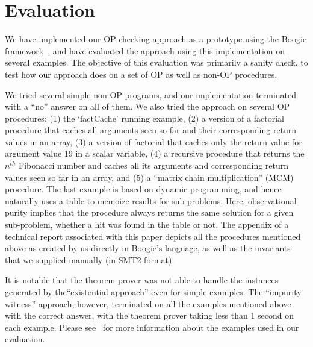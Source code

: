 \section{Evaluation}\label{sec:experiments}

We have implemented our OP checking approach as a prototype using the Boogie
framework~\cite{leino2008boogie}, and have evaluated the approach using
this implementation on several examples. The objective of this evaluation
was primarily a sanity check, to test how our approach does on a set of
OP as well as non-OP procedures.

We tried several simple non-OP programs, and our implementation terminated
with a ``no'' answer on all of them.  We also tried the approach on several
OP procedures: (1) the `factCache' running example, (2) a version of
a factorial procedure that caches all arguments seen so far and their
corresponding return values in an array, (3) a version of factorial that caches
only the return value for argument value 19 in a scalar variable, (4) a
recursive procedure that returns the $n^\mathit{th}$ Fibonacci number and
caches all its arguments and corresponding return values seen so far in an
array, and (5) a ``matrix chain multiplication'' (MCM) procedure.
The last example  is based
on dynamic programming, and hence naturally uses a table to memoize 
results for sub-problems. Here, observational purity implies that the procedure always
returns the same solution for a given sub-problem, whether a hit was found
in the table or not.  The appendix of a technical report associated with
this paper  depicts all the procedures
mentioned above as created by us directly in Boogie's language, as well as
the invariants that we supplied manually (in  SMT2
format).

It is notable that the theorem prover was not able to handle the instances
generated by the``existential approach'' even for simple examples.
The ``impurity witness'' approach, however,
terminated on all the examples mentioned above with the correct answer,
with the theorem prover taking less than 1 second on each example.
Please see~\cite{CheckingOP:arxiv} for more information about the examples
used in our evaluation.

